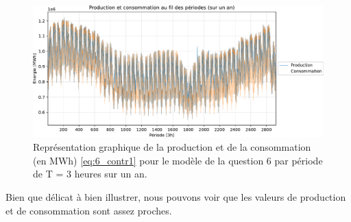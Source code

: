 \documentclass{article}
\begin{document}
\begin{figure}[H]
    \centering
    \includegraphics[scale=0.6]{GraphesP2/Prod_Cons_Q6.pdf}
    \caption{Représentation graphique de la production et de la consommation (en MWh) 
    \eqref{eq:6_contr1} pour le modèle de la question 6 par période de T = 3 heures sur un an.} 
    \label{fig:Q63}
\end{figure}
Bien que délicat à bien illustrer, nous pouvons voir que les valeurs de production et de consommation sont 
assez proches.
\end{document}
